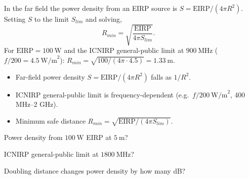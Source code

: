 \begin{workedexample}
In the far field the power density from an EIRP source is
$S = \text{EIRP}/(4\pi R^2)$. Setting $S$ to the limit $S_{lim}$ and solving,
\[ R_{min} = \sqrt{\frac{\text{EIRP}}{4\pi S_{lim}}}. \]
For $\text{EIRP} = 100\ \text{W}$ and the ICNIRP general-public limit at
$900\ \text{MHz}$ ($f/200 = 4.5\ \text{W/m}^2$):
$R_{min} = \sqrt{100/(4\pi\cdot4.5)} = 1.33\ \text{m}$.
\end{workedexample}

\begin{keytakeaways}
\begin{itemize}[leftmargin=1.4em,itemsep=2pt]
\item Far-field power density $S = \text{EIRP}/(4\pi R^2)$ falls as $1/R^2$.
\item ICNIRP general-public limit is frequency-dependent (e.g.\ $f/200\ \text{W/m}^2$, 400 MHz--2 GHz).
\item Minimum safe distance $R_{min} = \sqrt{\text{EIRP}/(4\pi S_{lim})}$.
\end{itemize}
\end{keytakeaways}

\begin{exercises}
\item Power density from $100\ \text{W}$ EIRP at $5\ \text{m}$?
\item ICNIRP general-public limit at $1800\ \text{MHz}$?
\item Doubling distance changes power density by how many dB?
\end{exercises}

